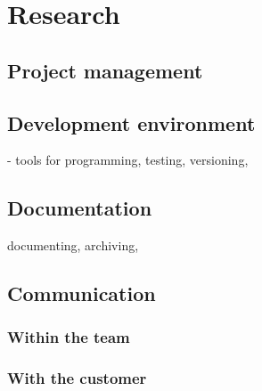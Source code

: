 \chapter{Research}
\section{Project management}
\section{Development environment}
- tools for programming, testing, versioning, 
\section{Documentation}
documenting, archiving,


\section{Communication}
\subsection{Within the team}
\subsection{With the customer}
